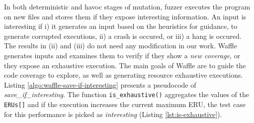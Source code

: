 
In both deterministic and havoc stages of mutation, fuzzer executes the program on new files and stores them if they expose interesting information. An input is interesting if i) it generates an input based on the heuristics for guidance, to generate corrupted executions, ii) a crash is occured, or iii) a hang is occured. The results in (ii) and (iii) do not need any modification in our work. Waffle generates inputs and examines them to verify if they show a \textit{new coverage}, or they expose an exhaustive execution. The main goals of Waffle are to guide the code coverage to explore, as well as generating resource exhaustive executions. Listing \ref{algo:waffle-save-if-interesting} presents a pseudocode of \textit{save\_if\_interesting}. The function \texttt{is\_exhaustive()} aggregates the values of the \texttt{ERUs[]} and if the execution increases the current maximum ERU, the test case for this performance is picked as \textit{interesting} (Listing \ref{lst:is-exhaustive}).





